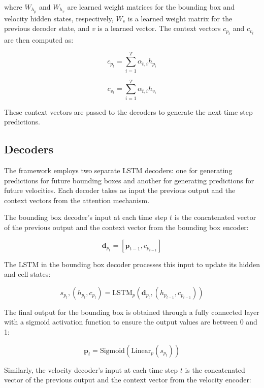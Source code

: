 \documentclass[12pt,oneside]{book} %
\begin{document}
where $W_{h_p}$ and $W_{h_v}$ are learned weight matrices for the bounding box
and velocity hidden states, respectively, $W_s$ is a learned weight matrix for
the previous decoder state, and $v$ is a learned vector. The context vectors
$c_{p_t}$ and $c_{v_t}$ are then computed as:

\begin{equation}
    c_{p_t} = \sum_{i=1}^{T} \alpha_{t,i} h_{p_i}
\end{equation}

\begin{equation}
    c_{v_t} = \sum_{i=1}^{T} \alpha_{t,i} h_{v_i}
\end{equation}

These context vectors are passed to the decoders to generate the next time step
predictions.

\subsection{Decoders}
The framework employs two separate LSTM decoders: one for generating
predictions for future bounding boxes and another for generating predictions
for future velocities. Each decoder takes as input the previous output and the
context vectors from the attention mechanism.

The bounding box decoder's input at each time step $t$ is the concatenated
vector of the previous output and the context vector from the bounding box
encoder:

\begin{equation}
    \mathbf{d}_{p_t} = [\mathbf{p}_{t-1}, c_{p_{t-1}}]
\end{equation}

The LSTM in the bounding box decoder processes this input to update its hidden
and cell states:

\begin{equation}
    s_{p_t}, (h_{p_t}, c_{p_t}) = \text{LSTM}_p(\mathbf{d}_{p_t}, (h_{p_{t-1}}, c_{p_{t-1}}))
\end{equation}

The final output for the bounding box is obtained through a fully connected
layer with a sigmoid activation function to ensure the output values are
between 0 and 1:

\begin{equation}
    \mathbf{p}_t = \text{Sigmoid}(\text{Linear}_p(s_{p_t}))
\end{equation}

Similarly, the velocity decoder's input at each time step $t$ is the
concatenated vector of the previous output and the context vector from the
velocity encoder:
\end{document}

